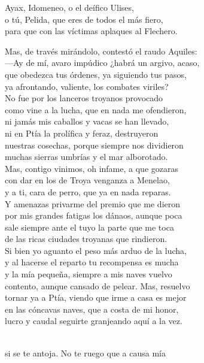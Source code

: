 Ayax, Idomeneo, o el deífico Ulises,\\
o tú, Pelida, que eres de todos el más fiero,\\
para que con las víctimas aplaques al Flechero.\par
Mas, de través mirándolo, contestó el raudo Aquiles:\\
---Ay de mí, avaro impúdico ¿habrá un argivo, acaso,\\
que obedezca tus órdenes, ya siguiendo tus pasos,\\
ya afrontando, valiente, los combates viriles?\\
No fue por los lanceros troyanos provocado\\
como vine a la lucha, que en nada me ofendieron,\\
ni jamás mis caballos y vacas se han llevado,\\
ni en Ptía la prolífica y feraz, destruyeron\\
nuestras cosechas, porque siempre nos dividieron\\
muchas sierras umbrías y el mar alborotado.\\
Mas, contigo vinimos, oh infame, a que gozaras\\
con dar en los de Troya venganza a Menelao,\\
y a ti, cara de perro, que ya en nada reparas.\\
Y amenazas privarme del premio que me dieron\\
por mis grandes fatigas los dánaos, aunque poca\\
sale siempre ante el tuyo la parte que me toca\\
de las ricas ciudades troyanas que rindieron.\\
Si bien yo aguanto el peso más arduo de la lucha,\\
y al hacerse el reparto tu recompensa es mucha\\
y la mía pequeña, siempre a mis naves vuelvo\\
contento, aunque cansado de pelear. Mas, resuelvo\\
tornar ya a Ptía, viendo que irme a casa es mejor\\
en las cóncavas naves, que a costa de mi honor,\\
lucro y caudal seguirte granjeando aquí a la vez.\par
{}\\
si se te antoja. No te ruego que a causa mía\\
